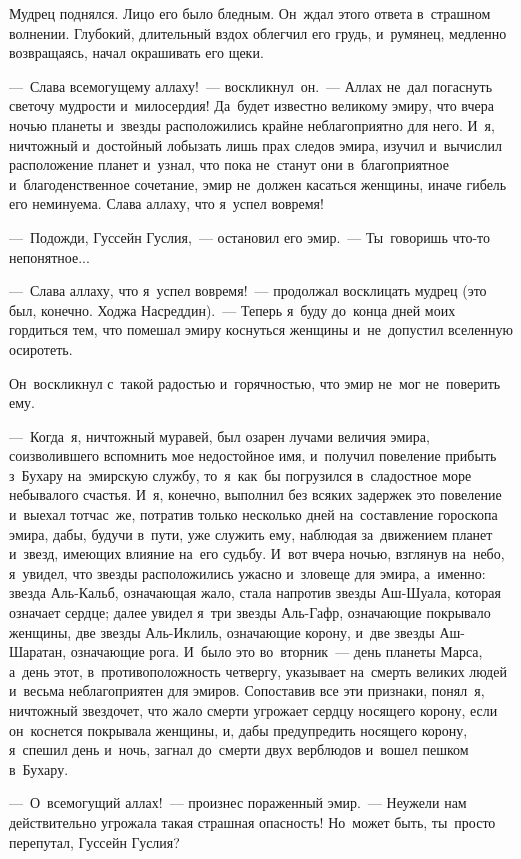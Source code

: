 \documentclass[12pt,a4paper]{book}
\begin{document}
Мудрец поднялся. Лицо его было бледным. Он~ждал этого ответа в~страшном волнении. Глубокий, длительный вздох облегчил его грудь, и~румянец, медленно возвращаясь, начал окрашивать его щеки.

—~Слава всемогущему аллаху!~— воскликнул~он.~— Аллах не~дал погаснуть светочу мудрости и~милосердия! Да~будет известно великому эмиру, что вчера ночью планеты и~звезды расположились крайне неблагоприятно для него. И~я, ничтожный и~достойный лобызать лишь прах следов эмира, изучил и~вычислил расположение планет и~узнал, что пока не~станут они в~благоприятное и~благоденственное сочетание, эмир не~должен касаться женщины, иначе гибель его неминуема. Слава аллаху, что я~успел вовремя!

—~Подожди, Гуссейн Гуслия,~— остановил его эмир.~— Ты~говоришь что-то непонятное...

—~Слава аллаху, что я~успел вовремя!~— продолжал восклицать мудрец (это был, конечно. Ходжа Насреддин).~— Теперь я~буду до~конца дней моих гордиться тем, что помешал эмиру коснуться женщины и~не~допустил вселенную осиротеть.

Он~воскликнул с~такой радостью и~горячностью, что эмир не~мог не~поверить ему.

—~Когда~я, ничтожный муравей, был озарен лучами величия эмира, соизволившего вспомнить мое недостойное имя, и~получил повеление прибыть з~Бухару на~эмирскую службу, то~я~как~бы погрузился в~сладостное море небывалого счастья. И~я, конечно, выполнил без всяких задержек это повеление и~выехал тотчас~же, потратив только несколько дней на~составление гороскопа эмира, дабы, будучи в~пути, уже служить ему, наблюдая за~движением планет и~звезд, имеющих влияние на~его судьбу. И~вот вчера ночью, взглянув на~небо, я~увидел, что звезды расположились ужасно и~зловеще для эмира, а~именно: звезда Аль-Кальб, означающая жало, стала напротив звезды Аш-Шуала, которая означает сердце; далее увидел я~три звезды Аль-Гафр, означающие покрывало женщины, две звезды Аль-Иклиль, означающие корону, и~две звезды Аш-Шаратан, означающие рога. И~было это во~вторник~— день планеты Марса, а~день этот, в~противоположность четвергу, указывает на~смерть великих людей и~весьма неблагоприятен для эмиров. Сопоставив все эти признаки, понял~я, ничтожный звездочет, что жало смерти угрожает сердцу носящего корону, если он~коснется покрывала женщины, и, дабы предупредить носящего корону, я~спешил день и~ночь, загнал до~смерти двух верблюдов и~вошел пешком в~Бухару.

—~О~всемогущий аллах!~— произнес пораженный эмир.~— Неужели нам действительно угрожала такая страшная опасность! Но~может быть, ты~просто перепутал, Гуссейн Гуслия?
\end{document}
